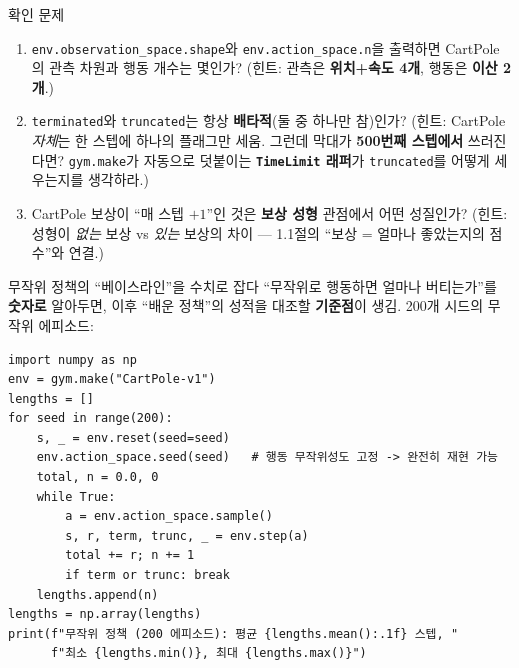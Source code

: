 \documentclass[aspectratio=169,11pt]{beamer}
\begin{document}
\begin{frame}{확인 문제}
  \begin{enumerate}
    \item \texttt{env.observation\_space.shape}와
      \texttt{env.action\_space.n}을 출력하면 CartPole의 관측 차원과
      행동 개수는 몇인가? (힌트: 관측은 \textbf{위치+속도 4개},
      행동은 \textbf{이산 2개}.)
    \item \texttt{terminated}와 \texttt{truncated}는 항상
      \textbf{배타적}(둘 중 하나만 참)인가?
      (힌트: CartPole \textit{자체}는 한 스텝에 하나의 플래그만 세움.
      그런데 막대가 \textbf{500번째 스텝에서} 쓰러진다면?
      \texttt{gym.make}가 자동으로 덧붙이는 \textbf{\texttt{TimeLimit}
      래퍼}가 \texttt{truncated}를 어떻게 세우는지를 생각하라.)
    \item CartPole 보상이 ``매 스텝 $+1$''인 것은 \textbf{보상 성형}
      관점에서 어떤 성질인가? (힌트: 성형이 \textit{없는} 보상 vs
      \textit{있는} 보상의 차이 --- 1.1절의 ``보상 = 얼마나 좋았는지의
      점수''와 연결.)
  \end{enumerate}
\end{frame}

\begin{frame}[fragile]{무작위 정책의 ``베이스라인''을 수치로 잡다}
  ``무작위로 행동하면 얼마나 버티는가''를 \textbf{숫자로} 알아두면,
  이후 ``배운 정책''의 성적을 대조할 \textbf{기준점}이 생김.
  200개 시드의 무작위 에피소드:
\begin{lstlisting}
import numpy as np
env = gym.make("CartPole-v1")
lengths = []
for seed in range(200):
    s, _ = env.reset(seed=seed)
    env.action_space.seed(seed)   # 행동 무작위성도 고정 -> 완전히 재현 가능
    total, n = 0.0, 0
    while True:
        a = env.action_space.sample()
        s, r, term, trunc, _ = env.step(a)
        total += r; n += 1
        if term or trunc: break
    lengths.append(n)
lengths = np.array(lengths)
print(f"무작위 정책 (200 에피소드): 평균 {lengths.mean():.1f} 스텝, "
      f"최소 {lengths.min()}, 최대 {lengths.max()}")
\end{lstlisting}
\end{frame}
\end{document}
